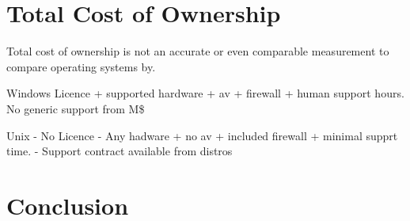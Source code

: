 \documentclass[a4paper,10pt]{article}
\begin{document}
\section*{Total Cost of Ownership}

Total cost of ownership is not an accurate or even comparable
measurement to compare operating systems by.

Windows Licence + supported hardware + av + firewall + human support
hours. No generic support from M\$

Unix - No Licence - Any hadware + no av + included firewall + minimal
supprt time. - Support contract available from distros

\section*{Conclusion}
\end{document}
